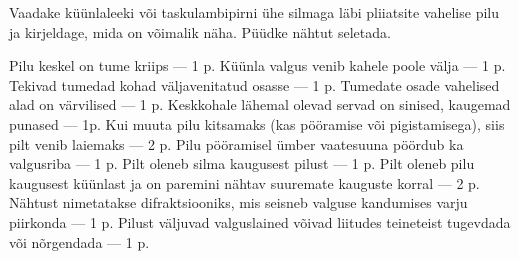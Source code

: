 
Vaadake küünlaleeki või taskulambipirni ühe silmaga läbi pliiatsite vahelise pilu ja kirjeldage, mida on võimalik näha. Püüdke nähtut seletada.

\hint

\solu
Pilu keskel on tume kriips --- 1 p. Küünla valgus venib kahele poole välja --- 1 p. Tekivad tumedad kohad väljavenitatud osasse --- 1 p. Tumedate osade vahelised alad on värvilised --- 1 p. Keskkohale lähemal olevad servad on sinised, kaugemad punased --- 1p. Kui muuta pilu kitsamaks (kas pööramise või pigistamisega), siis pilt venib laiemaks --- 2 p. Pilu pööramisel ümber vaatesuuna pöördub ka valgusriba --- 1 p. Pilt oleneb silma kaugusest pilust --- 1 p. Pilt oleneb pilu kaugusest küünlast ja on paremini nähtav suuremate kauguste korral --- 2 p. Nähtust nimetatakse difraktsiooniks, mis seisneb valguse kandumises varju piirkonda --- 1 p. Pilust väljuvad valguslained võivad liitudes teineteist tugevdada või nõrgendada --- 1 p.
\probend
